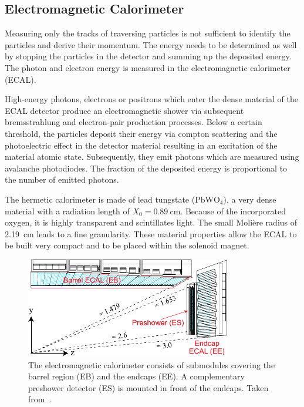 \subsection{Electromagnetic Calorimeter}

Measuring only the tracks of traversing particles is not sufficient to identify
the particles and derive their momentum. The energy needs to be determined as well
by stopping the particles in the detector and summing up the
deposited energy. The photon and electron energy is measured in the
electromagnetic calorimeter (ECAL). 

High-energy photons, electrons or positrons which enter the dense material of
the ECAL detector produce an electromagnetic shower via subsequent
bremsstrahlung and electron-pair production processes. Below a certain
threshold, the particles deposit their energy via compton scattering and the
photoelectric effect in the detector material resulting in an excitation of the
material atomic state. Subsequently, they emit photons which are measured using
avalanche photodiodes. The fraction of the deposited energy is proportional to
the number of emitted photons.

The hermetic calorimeter is made of lead tungstate ($\mathrm{PbWO}_4$), a very
dense material with a radiation length of $X_0 = \SI{0.89}{\centi\meter}$.
Because of the incorporated oxygen, it is highly transparent and scintillates
light. The small Moli\`ere  radius of \SI{2.19}{\centi\meter} leads to a fine
granularity.  These material properties allow the ECAL to be built very compact
and to be placed within the solenoid magnet. 

\begin{figure}[htp]
    \centering
    \includegraphics[width=0.8\textwidth]{figures/cms_detector/cms_ecal.pdf}\hfill
    \caption[Electromagnetic Calorimeter]{The electromagnetic calorimeter
    consists of submodules covering the barrel region (EB) and the endcaps (EE).
    A complementary preshower detector (ES) is mounted in front of the
    endcaps. Taken from~\cite{Bayatian:922757}.}
    \label{fig:cms:ecal}
\end{figure}

